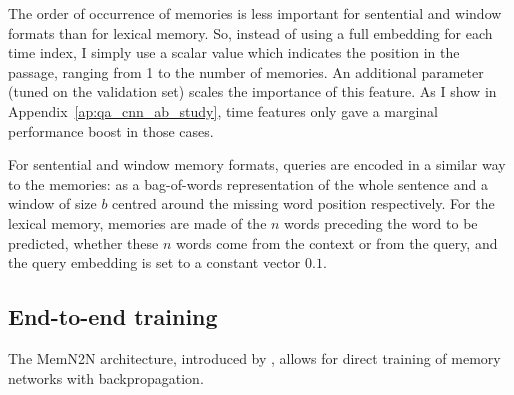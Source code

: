 The order of occurrence of memories is less important for sentential and window formats than for lexical memory. So, instead of using a full embedding for each time index, I simply use a scalar value which indicates the position in the passage, ranging from 1 to the number of memories. An additional parameter (tuned on the validation set) scales the importance of this feature. As I show in Appendix~\ref{ap:qa_cnn_ab_study}, time features only gave a marginal performance boost in those cases.


For sentential and window memory formats, queries are encoded in a similar way to the memories: as a bag-of-words representation of the whole sentence and a window of size $b$ centred around the missing word position respectively.
%
For the lexical memory, memories are made of the $n$ words preceding the word to be predicted, whether these $n$ words come from the context or from the query, and the query embedding is set to a constant vector $0.1$. 

\subsection{End-to-end training} \label{sec:mod_o}

The {MemN2N} architecture, introduced by \cite{sukhbaatar2015end}, allows for direct training of memory networks with backpropagation.

